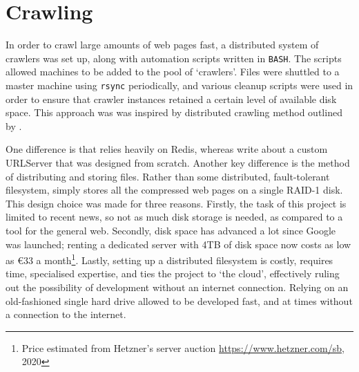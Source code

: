 \section{Crawling\label{crawling}}
In order to crawl large amounts of web pages fast, a
distributed system of crawlers was set up, along with
automation scripts written in {\tt BASH}. The scripts allowed
machines to be added to the pool of `crawlers'.  Files were shuttled
to a master machine using {\tt rsync} periodically, and various
cleanup scripts were used in order to ensure that crawler
instances retained a certain level of available disk space.  This
approach was was inspired by distributed crawling method outlined by
.

One difference is that
\nr{} relies heavily on Redis, whereas \citeauthor{page1998} write
about a custom URLServer that was designed from scratch.
Another key difference is
the method of distributing and storing files.  Rather than some
distributed, fault-tolerant filesystem, \nr{} simply stores all the
compressed web pages on a single RAID-1 disk.  This design
choice was made for three reasons.  Firstly, the task of this
project is limited to recent news, so not as much disk storage is
needed, as compared to a tool for the general web.  Secondly,
disk space has advanced a lot since Google was launched;
renting a dedicated server with 4TB of disk space now costs
as low as €33 a month\footnote{Price estimated from Hetzner's server auction \url{https://www.hetzner.com/sb}, 2020}.  Lastly, setting up a distributed filesystem
is costly, requires time, specialised expertise, and ties the
project to `the cloud', effectively ruling out the possibility of
development without an internet connection.
Relying on an
old-fashioned single hard drive allowed \nr{} to be developed fast,
and at times without a connection to the internet.